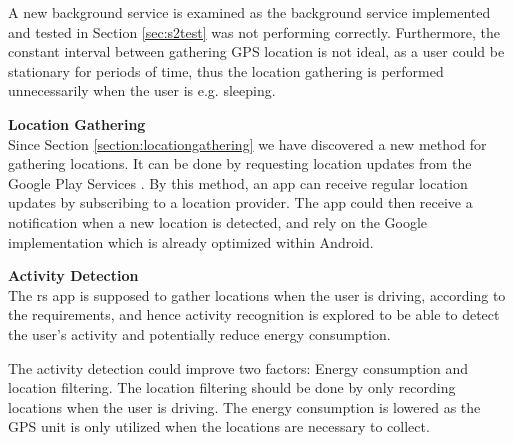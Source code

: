 A new background service is examined as the background service implemented and tested in Section \ref{sec:s2test} was not performing correctly.
Furthermore, the constant interval between gathering GPS location is not ideal, as a user could be stationary for periods of time, thus the location gathering is performed unnecessarily when the user is e.g. sleeping.

\textbf{Location Gathering}\\
Since Section \ref{section:locationgathering} we have discovered a new method for gathering locations. 
It can be done by requesting location updates from the Google Play Services \cite{receivingLocationUpdates}.
By this method, an app can receive regular location updates by subscribing to a location provider.
The app could then receive a notification when a new location is detected, and rely on the Google implementation which is already optimized within Android.

\textbf{Activity Detection}\\
The \gls{rs} app is supposed to gather locations when the user is driving, according to the requirements, and hence activity recognition is explored to be able to detect the user's activity and potentially reduce energy consumption.

The activity detection could improve two factors: Energy consumption and location filtering.
The location filtering should be done by only recording locations when the user is driving.
The energy consumption is lowered as the GPS unit is only utilized when the locations are necessary to collect.
